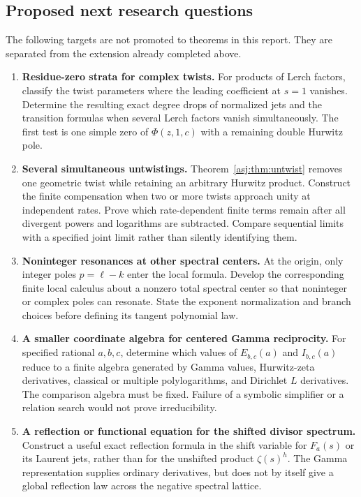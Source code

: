\documentclass[11pt]{article}
\numberwithin{equation}{section}
\theoremstyle{definition}\newtheorem{definition}[theorem]{Definition}
\theoremstyle{remark}\newtheorem{remark}[theorem]{Remark}\newtheorem{example}[theorem]{Example}
\begin{document}
\subsection{Proposed next research questions}
The following targets are not promoted to theorems in this report.
They are separated from the extension already completed above.
\begin{enumerate}[leftmargin=*,label=\textbf{Q\arabic*.},itemsep=7pt]
\item \textbf{Residue-zero strata for complex twists.}
For products of Lerch factors, classify the twist parameters where the
leading coefficient at $s=1$ vanishes. Determine the resulting exact
degree drops of normalized jets and the transition formulas when several
Lerch factors vanish simultaneously. The first test is one simple zero
of $\Phi(z,1,c)$ with a remaining double Hurwitz pole.

\item \textbf{Several simultaneous untwistings.}
Theorem~\ref{asj:thm:untwist} removes one geometric twist while retaining an
arbitrary Hurwitz product. Construct the finite compensation when two
or more twists approach unity at independent rates. Prove which
rate-dependent finite terms remain after all divergent powers and
logarithms are subtracted. Compare sequential limits with a specified
joint limit rather than silently identifying them.

\item \textbf{Noninteger resonances at other spectral centers.}
At the origin, only integer poles $p=\ell-k$ enter the local formula.
Develop the corresponding finite local calculus about a nonzero total
spectral center so that noninteger or complex poles can resonate.
State the exponent normalization and branch choices before defining
its tangent polynomial law.

\item \textbf{A smaller coordinate algebra for centered Gamma reciprocity.}
For specified rational $a,b,c$, determine which values of $E_{b,c}(a)$
and $I_{b,c}(a)$ reduce to a finite algebra generated by Gamma values,
Hurwitz-zeta derivatives, classical or multiple polylogarithms, and
Dirichlet $L$ derivatives. The comparison algebra must be fixed.
Failure of a symbolic simplifier or a relation search would not prove
irreducibility.

\item \textbf{A reflection or functional equation for the shifted divisor spectrum.}
Construct a useful exact reflection formula in the shift variable for
$F_a(s)$ or its Laurent jets, rather than for the unshifted product
$\zeta(s)^h$. The Gamma representation supplies ordinary derivatives,
but does not by itself give a global reflection law across the negative
spectral lattice.


\end{enumerate}
\end{document}
